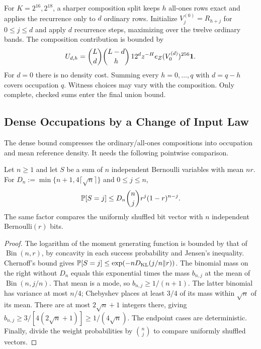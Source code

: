 For $K=2^{16},2^{18}$, a sharper composition split keeps $h$ all-ones
rows exact and applies the recurrence only to $d$ ordinary rows.
Initialize $V_j^{(0)}=R_{h+j}$ for $0\le j\le d$ and apply $d$ recurrence
steps, maximizing over the twelve ordinary bands.
The composition contribution is bounded by
\[
 U_{d,h}=\binom Ld\binom{L-d}{h}\,12^d
          z^{-H}e_Z(V_0^{(d)})^{256}\mathbf 1.
\]
For $d=0$ there is no density cost. Summing every $h=0,\ldots,q$ with
$d=q-h$ covers occupation $q$. Witness choices may vary with the composition.
Only complete, checked sums enter the final union bound.

\subsection{Dense Occupations by a Change of Input Law}

The dense bound compresses the ordinary/all-ones compositions into occupation
and mean reference density. It needs the following pointwise comparison.

\begin{lemma}
\label{lem:finite-shuffled-bernoulli}
Let $n\ge1$ and let $S$ be a sum of $n$ independent Bernoulli variables with mean $nr$.
For $D_n:=\min\{n+1,4\lceil\sqrt n\rceil\}$ and $0\le j\le n$,
\[
 \mathbb P[S=j]\le D_n\binom njr^j(1-r)^{n-j}.
\]
The same factor compares the uniformly shuffled bit vector with
$n$ independent Bernoulli$(r)$ bits.
\end{lemma}
\begin{proof}
The logarithm of the moment generating function is bounded by that of
$\operatorname{Bin}(n,r)$, by concavity in each success probability and
Jensen's inequality. Chernoff's bound gives
$\mathbb P[S=j]\le\exp(-nD_{\rm KL}(j/n\Vert r))$.
The binomial mass on the right without $D_n$ equals this exponential
times the mass $b_{n,j}$ at the mean of $\operatorname{Bin}(n,j/n)$.
That mean is a mode, so $b_{n,j}\ge1/(n+1)$.
The latter binomial has variance at most $n/4$; Chebyshev places at least
$3/4$ of its mass within $\sqrt n$ of its mean. There are at most
$2\sqrt n+1$ integers there, giving
$b_{n,j}\ge3/[4(2\sqrt n+1)]\ge1/(4\sqrt n)$.
The endpoint cases are deterministic. Finally, divide the weight
probabilities by $\binom nj$ to compare uniformly shuffled vectors.
\end{proof}

